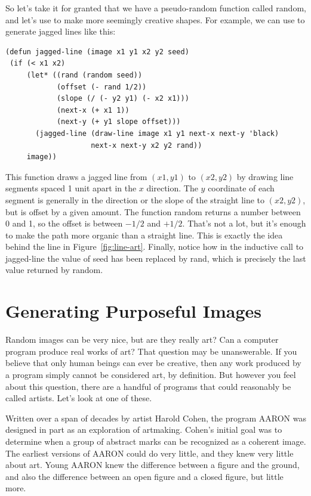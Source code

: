 So let's take it for granted that we have a pseudo-random function 
called \textsf{random}, and let's use to make more seemingly creative 
shapes. For example, we can use to generate jagged lines
like this:
\begin{Verbatim}
(defun jagged-line (image x1 y1 x2 y2 seed)
 (if (< x1 x2)
     (let* ((rand (random seed))
            (offset (- rand 1/2))
            (slope (/ (- y2 y1) (- x2 x1)))
            (next-x (+ x1 1))
            (next-y (+ y1 slope offset)))
       (jagged-line (draw-line image x1 y1 next-x next-y 'black)
                    next-x next-y x2 y2 rand))
     image))
\end{Verbatim}
This function draws a jagged line from $(x1,y1)$ to $(x2,y2)$ by
drawing line segments spaced 1 unit apart in the $x$ direction. 
The $y$ coordinate of each segment is generally in the direction
or the slope of the straight line to $(x2,y2)$, but is offset 
by a given amount.  The function \textsf{random} returns a number 
between 0 and 1, so the \textsf{offset} is between $-1/2$ and $+1/2$.
That's not a lot, but it's enough to make the path more organic
than a straight line. This is exactly the idea behind the line
in Figure~\ref{fig:line-art}. Finally, notice how in the inductive
call to \textsf{jagged-line} the value of \textsf{seed} has been
replaced by \textsf{rand}, which is precisely the last value returned
by \textsf{random}.

\section{Generating Purposeful Images}

Random images can be very nice, but are they really art? Can a computer
program produce real works of art? That question may be unanswerable.
If you believe that only human beings can ever be creative, then any
work produced by a program simply cannot be considered art, by
definition. But however you feel about this question, there are a
handful of programs that could reasonably be called artists. Let's
look at one of these.

Written over a span of decades by artist Harold Cohen, the program 
AARON was designed in part as an exploration of artmaking. Cohen's 
initial goal was to determine when a group of abstract marks can
be recognized as a coherent image. The earliest versions of AARON 
could do very little, and they knew very little about art. Young
AARON knew the difference between a figure and the ground, and also
the difference between an open figure and a closed figure, but
little more. 

